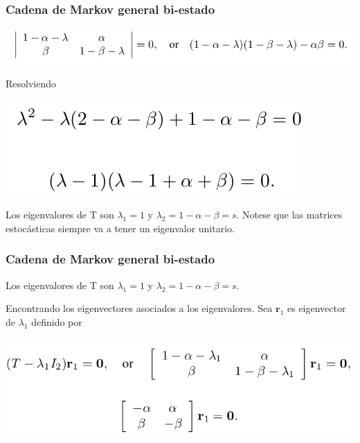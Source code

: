 \documentclass[spanish]{beamer}
\begin{document}
\begin{frame}
\frametitle{Cadena de Markov general bi-estado}
\begin{center}
\includegraphics[scale=0.35]{im3}
\end{center}
Resolviendo
\begin{center}
\includegraphics[scale=0.4]{im4}
\end{center}
Los eigenvalores de T son $\lambda_{1}=1$ y $\lambda_{2}= 1-\alpha-\beta =s$. Notese que las matrices estocásticas siempre va a tener un eigenvalor unitario.
\end{frame}


\begin{frame}
\frametitle{Cadena de Markov general bi-estado}
Los eigenvalores de T son $\lambda_{1}=1$ y $\lambda_{2}= 1-\alpha-\beta =s$. 

Encontrando los eigenvectores asociados a los eigenvalores. Sea $\textbf{r}_{1}$ es eigenvector de $\lambda_{1}$ definido por 


\begin{center}
\includegraphics[scale=0.4]{im5}
\end{center}


\end{frame}
\end{document}
